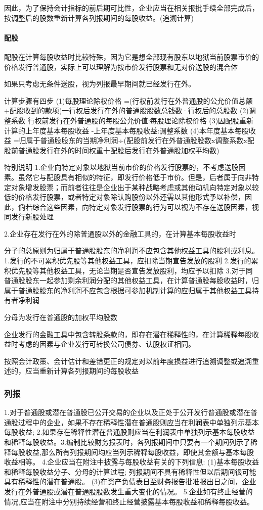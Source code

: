 \documentclass[UTF8,12pt]{ctexart}
\numberwithin{equation}{section} %
\numberwithin{figure}{section}
\numberwithin{table}{section}
\begin{document}
	因此，为了保持会计指标的前后期可比性，企业应当在相关报批手续全部完成后，按调整后的股数重新计算各列报期间的每股收益。(追溯计算)
	\paragraph{配股}
	配股在计算每股收益时比较特殊，因为它是想全部现有股东以地狱当前股票市价的价格发行普通股，实际上可以理解为按市价发行股票和无对价送股的混合体
	
	如果只考虑无条件送股，视为列报最早期间就已经发行在外。
	
	计算步骤有四步
	(1)每股理论除权价格
	=(行权前发行在外普通股的公允价值总额+配股收到的款项)一行权后发行在外的普通股股数总钱数·行权后的总股数
	(2)调整系数
	行权前发行在外普通股的每股公允价值:每股理论除权价格
	(3)因配股重新计算的上年度基本每股收益
	-上年度基本每股收益:调整系数
	(4)本年度基本每股收益
	=归属于普通股股东的当期净利润÷(配股前发行在外普通股股数x调整系数x配股前普通股发行在外的时间权重十配股后发行在外普通股加权平均数)
	
	特别说明
	1.企业向特定对象以地狱当前市价的价格发行股票的，不考虑送股因素。虽然它与配股具有相似的特征，即发行价格低于市价。但是，后者属于向非特定对象增发股票；而前者往往是企业出于某种战略考虑或其他动机向特定对象以较低的价格发行股票，或者特定对象除认购股份以外还需以其他形式予以补偿，因此，倘若综合这些因素，向特定对象发行股票的行为可以视为不存在送股因素，视同发行新股处理
	
	2.企业存在发行在外的除普通股以外的金融工具的，在计算基本每股收益时
	
	分子的总原则为归属于普通股股东的净利润不应包含其他权益工具的股利或利息。
	1.发行的不可累积优先股等其他权益工具，应扣除当期宣告发放的股利
	2.发行的累积优先股等其他权益工具，无论当期是否宣告发放股利，均应予以扣除
	3.对于同普通股股东一起参加剩余利润分配的其他权益工具，在计算普通股每股收益时，归属于普通股股东的净利润不应包含根据可参加机制计算的应归属于其他权益工具持有者净利润
	
	分母为发行在普通股的加权平均股数
	
	企业发行的金融工具中包含转股条款的，即存在潜在稀释性的，在计算稀释每股收益时考虑的因素与企业发行可转换公司债券、认股权证相同。
	
	按照会计政策、会计估计和差错更正的规定对以前年度损益进行追溯调整或追溯重述的，应当重新计算各列报期间的每股收益
	\subsubsection{列报}
	1.对于普通股或潜在普通股已公开交易的企业以及正处于公开发行普通股或潜在普通股过程中的企业，如果不存在稀释性潜在普通股则应当在利润表中单独列示基本每股收益;
	2.如果存在稀释性潜在普通股则应当在利润表中单独列示基本每股收益和稀释每股收益。3.编制比较财务报表时，各列报期间中只要有一个期间列示了稀释每股收益,那么所有列报期间均应当列示稀释每股收益，即使其金额与基本每股收益相等。
	4.企业应当在附注中披露与每股收益有关的下列信息:
	(1)基本每股收益和稀释每股收益分子、分母的计算过程;
	列报期间不具有稀释性但以后期间很可能具有稀释性的潜在普通股。
	(3)在资产负债表日至财务报告批准报出日之间，企业发行在外普通股或潜在普通股股数发生重大变化的情况。
	5.企业如有终止经营的情况,应当在附注中分别持续经营和终止经营披露基本每股收益和稀释每股收益。
	
\end{document}
